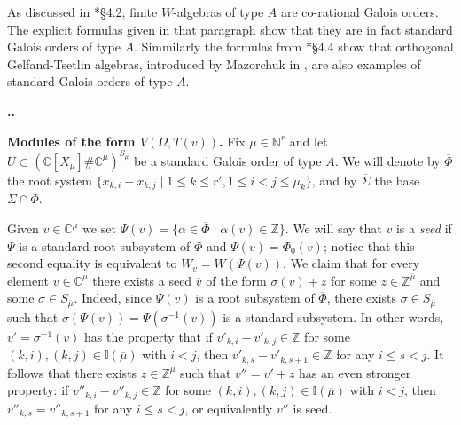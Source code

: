 \documentclass[11pt,fleqn]{amsart}
\renewcommand\thesection{\arabic{section}}
\newcounter{para}[section]
\renewcommand\thepara{\thesection.\arabic{para}}
\def\paragraph{%
 \noindent
 \refstepcounter{para}%
 \textbf{\thepara.}\hspace{1ex}%
}
\newcommand\about[1]{%
 {\bfseries#1.}%
}
\newcommand\NN{\mathbb N}
\newcommand\CC{\mathbb C}
\newcommand\ZZ{\mathbb Z}
\newcommand\II{\mathbb I}
\newcommand\vv{\overline{v}}
\begin{document}
\begin{Example*}
As discussed in \cite{Hart-rational-galois}*{\S 4.2}, finite $W$-algebras of
type $A$ are co-rational Galois orders. The explicit formulas given in that
paragraph show that they are in fact standard Galois orders of type $A$.
Simmilarly the formulas from \cite{Hart-rational-galois}*{\S 4.4} show that
orthogonal Gelfand-Tsetlin algebras, introduced by Mazorchuk in 
\cite{Maz-orthogonal-GT-alg}, are also examples of standard Galois orders
of type $A$.
\end{Example*}

\paragraph
\about{Modules of the form $V(\Omega, T(v))$}\label{par-mod-omega}
Fix $\mu \in \NN^r$ and let $U \subset (\CC[X_\mu] \# \CC^\mu)^{S_\mu}$ be a
standard Galois order of type $A$. We will denote by $\overline \Phi$ the root 
system $\{x_{k,i} - x_{k,j} \mid 1 \leq k \leq r', 1 \leq i < j \leq \mu_k\}$, 
and by $\overline \Sigma$ the base $\Sigma \cap \overline \Phi$. 

Given $v \in \CC^\mu$ we set $\Psi(v) = \{\alpha \in \overline \Phi \mid 
\alpha(v) \in \ZZ\}$. We will say that $v$ is a \emph{seed} if $\Psi$ is a
standard root subsystem of $\overline \Phi$ and $\Psi(v) = \overline 
\Phi_0(v)$; notice that this second equality is equivalent to $W_v = 
W(\Psi(v))$. We claim that for every element $v \in \CC^\mu$ there exists a 
seed $\vv$ of the form $\sigma(v) + z$ for some $z \in \ZZ^{\overline \mu}$ 
and some $\sigma \in S_{\overline \mu}$. Indeed, since $\Psi(v)$ is a root 
subsystem of $\overline \Phi$, there exists $\sigma \in S_{\overline \mu}$ 
such that $\sigma(\Psi(v)) = \Psi(\sigma^{-1}(v))$ is a standard subsystem. In 
other words, $v' = \sigma^{-1}(v)$ has the property that if $v'_{k,i} - 
v'_{k,j} \in \ZZ$ for some $(k,i), (k,j) \in \II(\overline \mu)$ with $i < j$, 
then $v'_{k,s} - v'_{k,s+1} \in \ZZ$ for any $i \leq s < j$. It follows that 
there exists $z \in \ZZ^{\overline \mu}$ such that $v'' = v'+z$ has an even 
stronger property: if $v''_{k,i} - v''_{k,j} \in \ZZ$ for some $(k,i), (k,j) 
\in \II(\overline \mu)$ with $i < j$, then $v''_{k,s} = v''_{k,s+1}$ for any 
$i \leq s < j$, or equivalently $v''$ is seed.  
\end{document}

